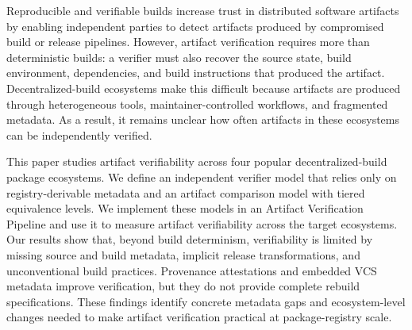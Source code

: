 Reproducible and verifiable builds increase trust in distributed software artifacts by enabling independent parties to detect artifacts produced by compromised build or release pipelines. 
However, artifact verification requires more than deterministic builds: a verifier must also recover the source state, build environment, dependencies, and build instructions that produced the artifact. 
Decentralized-build ecosystems make this difficult because artifacts are produced through heterogeneous tools, maintainer-controlled workflows, and fragmented metadata. 
As a result, it remains unclear how often artifacts in these ecosystems can be independently verified.

This paper studies artifact verifiability across four popular decentralized-build package ecosystems. 
We define an independent verifier model that relies only on registry-derivable metadata and an artifact comparison model with tiered equivalence levels. 
We implement these models in an Artifact Verification Pipeline and use it to measure artifact verifiability across the target ecosystems. 
Our results show that, beyond build determinism, verifiability is limited by missing source and build metadata, implicit release transformations, and unconventional build practices. 
Provenance attestations and embedded VCS metadata improve verification, but they do not provide complete rebuild specifications. 
These findings identify concrete metadata gaps and ecosystem-level changes needed to make artifact verification practical at package-registry scale.
